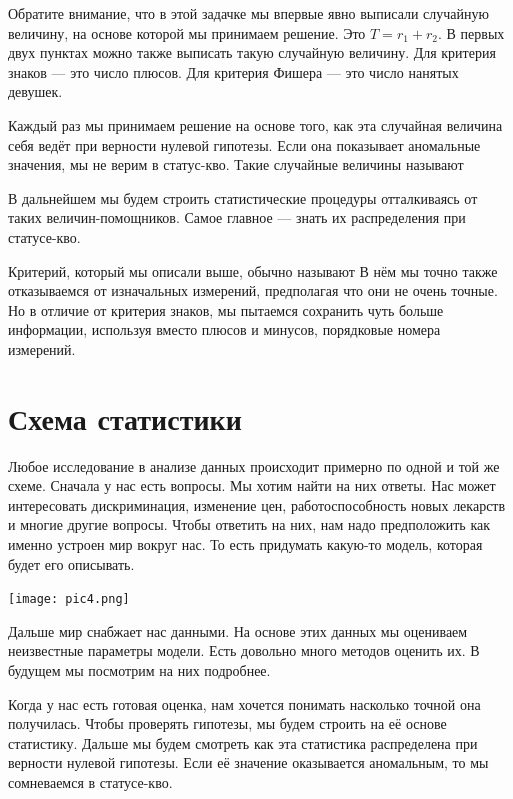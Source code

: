 \documentclass[12pt, a4paper, oneside]{article}
\begin{document}
Обратите внимание, что в этой задачке мы впервые явно выписали случайную величину, на основе которой мы принимаем решение. Это $T = r_1 + r_2$. В первых двух пунктах можно также выписать такую случайную величину. Для критерия знаков --- это число плюсов. Для критерия Фишера --- это число нанятых девушек. 

Каждый раз мы принимаем решение на основе того, как эта случайная величина себя ведёт при верности нулевой гипотезы. Если она показывает аномальные значения, мы не верим в статус-кво. Такие случайные величины называют  

В дальнейшем мы будем строить статистические процедуры отталкиваясь от таких величин-помощников. Самое главное --- знать их распределения при статусе-кво. 

Критерий, который мы описали выше, обычно называют  В нём мы точно также отказываемся от изначальных измерений, предполагая что они не очень точные. Но в отличие от критерия знаков, мы пытаемся сохранить чуть больше информации, используя вместо плюсов и минусов, порядковые номера измерений.

\section{Схема статистики}

Любое исследование в анализе данных происходит примерно по одной и той же схеме. Сначала у нас есть вопросы. Мы хотим найти на них ответы. Нас может интересовать дискриминация, изменение цен, работоспособность новых лекарств и многие другие вопросы. Чтобы ответить на них, нам надо предположить как именно устроен мир вокруг нас. То есть придумать какую-то модель, которая будет его описывать. 

\begin{center} 
\texttt{[image: pic4.png]}
\end{center} 

Дальше мир снабжает нас данными. На основе этих данных мы оцениваем неизвестные параметры модели. Есть довольно много методов оценить их. В будущем мы посмотрим на них подробнее. 

Когда у нас есть готовая оценка, нам хочется понимать насколько точной она получилась. Чтобы проверять гипотезы, мы будем строить на её основе статистику. Дальше мы будем смотреть как эта статистика распределена при верности нулевой гипотезы. Если её значение оказывается аномальным, то мы сомневаемся в статусе-кво.
\end{document}
